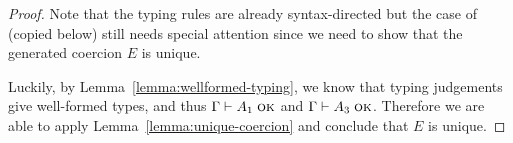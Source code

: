 \begin{proof}
  Note that the typing rules are already syntax-directed but the case of
   (copied below) still needs special attention since we
  need to show that the generated coercion $E$ is unique.
  \begin{mathpar}
  \end{mathpar}
  Luckily, by Lemma~\ref{lemma:wellformed-typing}, we know that typing
  judgements give well-formed types, and thus $\jwf \Gamma {A_1}$ and $\jwf
  \Gamma {A_3}$. Therefore we are able to apply
  Lemma~\ref{lemma:unique-coercion} and conclude that $E$ is unique.

\end{proof}
